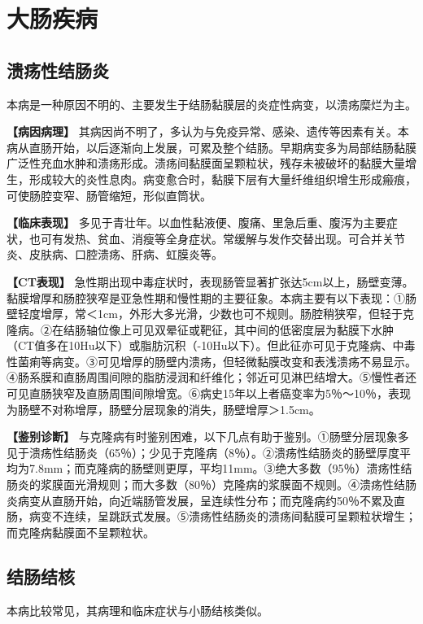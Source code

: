 \section{大肠疾病}

\subsection{溃疡性结肠炎}

本病是一种原因不明的、主要发生于结肠黏膜层的炎症性病变，以溃疡糜烂为主。

\textbf{【病因病理】}
其病因尚不明了，多认为与免疫异常、感染、遗传等因素有关。本病从直肠开始，以后逐渐向上发展，可累及整个结肠。早期病变多为局部结肠黏膜广泛性充血水肿和溃疡形成。溃疡间黏膜面呈颗粒状，残存未被破坏的黏膜大量增生，形成较大的炎性息肉。病变愈合时，黏膜下层有大量纤维组织增生形成瘢痕，可使肠腔变窄、肠管缩短，形似直筒状。

\textbf{【临床表现】}
多见于青壮年。以血性黏液便、腹痛、里急后重、腹泻为主要症状，也可有发热、贫血、消瘦等全身症状。常缓解与发作交替出现。可合并关节炎、皮肤病、口腔溃疡、肝病、虹膜炎等。

\textbf{【CT表现】}
急性期出现中毒症状时，表现肠管显著扩张达5cm以上，肠壁变薄。黏膜增厚和肠腔狭窄是亚急性期和慢性期的主要征象。本病主要有以下表现：①肠壁轻度增厚，常＜1cm，外形大多光滑，少数也可不规则。肠腔稍狭窄，但轻于克隆病。②在结肠轴位像上可见双晕征或靶征，其中间的低密度层为黏膜下水肿（CT值多在10Hu以下）或脂肪沉积（-10Hu以下）。但此征亦可见于克隆病、中毒性菌痢等病变。③可见增厚的肠壁内溃疡，但轻微黏膜改变和表浅溃疡不易显示。④肠系膜和直肠周围间隙的脂肪浸润和纤维化；邻近可见淋巴结增大。⑤慢性者还可见直肠狭窄及直肠周围间隙增宽。⑥病史15年以上者癌变率为5％～10％，表现为肠壁不对称增厚，肠壁分层现象的消失，肠壁增厚＞1.5cm。

\textbf{【鉴别诊断】}
与克隆病有时鉴别困难，以下几点有助于鉴别。①肠壁分层现象多见于溃疡性结肠炎（65％）；少见于克隆病（8％）。②溃疡性结肠炎的肠壁厚度平均为7.8mm；而克隆病的肠壁则更厚，平均11mm。③绝大多数（95％）溃疡性结肠炎的浆膜面光滑规则；而大多数（80％）克隆病的浆膜面不规则。④溃疡性结肠炎病变从直肠开始，向近端肠管发展，呈连续性分布；而克隆病约50％不累及直肠，病变不连续，呈跳跃式发展。⑤溃疡性结肠炎的溃疡间黏膜可呈颗粒状增生；而克隆病黏膜面不呈颗粒状。

\subsection{结肠结核}

本病比较常见，其病理和临床症状与小肠结核类似。

